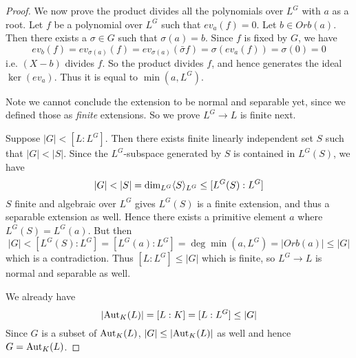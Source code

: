 \documentclass[../book.tex]{subfiles}
\begin{document}
\begin{proof}
        We now prove the product divides 
        all the polynomials over $L^G$ with $a$ as a root.
        Let $f$ be a polynomial over $L^G$ such that $ev_a(f) = 0$.
        Let $b\in Orb(a)$. 
        Then there exists a $\sigma \in G$ such that $\sigma(a) = b$.
        Since $f$ is fixed by $G$, we have
        \[
            ev_b (f) = ev_{\sigma(a)}(f) 
            = ev_{\sigma(a)}(\bar{\sigma} f)
            = \sigma (ev_a (f)) = \sigma(0) = 0
        \]
        i.e. $(X - b)$ divides $f$.
        So the product divides $f$, and hence generates the ideal $\ker(ev_a)$.
        Thus it is equal to $\min(a,L^G)$. 
        
    
        Note we cannot conclude the extension to be normal and separable yet,
        since we defined those as \emph{finite} extensions.
        So we prove $L^G \to L$ is finite next.
    
        Suppose $|G| < [L : L^G]$. 
        Then there exists finite linearly independent set $S$ such that $|G| < |S|$. 
        Since the $L^G$-subspace generated by $S$ is contained in $L^G(S)$, 
        we have \[ 
            |G| < |S| = \dim_{L^G} \langle S\rangle_{L^G} \leq [L^G(S) : L^G] 
        \]
        $S$ finite and algebraic over $L^G$ gives $L^G(S)$ is a finite extension,
        and thus a separable extension as well. 
        Hence there exists a primitive element $a$ where $L^G(S) = L^G(a)$. 
        But then \[
            |G| < [L^G(S) : L^G] = [L^G(a) : L^G] = \deg\min(a,L^G)
            = |Orb(a)| \leq |G|
        \]
        which is a contradiction. 
        Thus $[L : L^G] \leq |G|$ which is finite,
        so $L^G \to L$ is normal and separable as well.
    
        We already have \[
            |\text{Aut}_{K}(L)| = [L : K] = [L : L^G] \leq |G|
        \]
        Since $G$ is a subset of $\text{Aut}_{K}(L)$, 
        $|G| \leq |\text{Aut}_{K}(L)|$ as well and hence $G = \text{Aut}_{K}(L)$.  
    
\end{proof}
\end{document}
